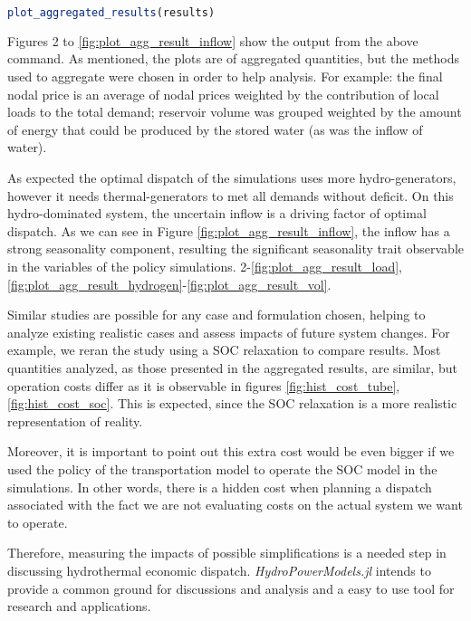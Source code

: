 \documentclass{juliacon}
\begin{document}
\begin{lstlisting}[language = Julia]
plot_aggregated_results(results)
\end{lstlisting}

Figures 2 to \ref{fig:plot_agg_result_inflow} show the output from the above command. As mentioned, the plots are of aggregated quantities, but the methods used to aggregate were chosen in order to help analysis. For example: the final nodal price is an average of nodal prices weighted by the contribution of local loads to the total demand; reservoir volume was grouped weighted by the amount of energy that could be produced by the stored water (as was the inflow of water).

As expected the optimal dispatch of the simulations uses more hydro-generators, however it needs thermal-generators to met all demands without deficit. On this hydro-dominated system, the uncertain inflow is a driving factor of optimal dispatch. As we can see in Figure \ref{fig:plot_agg_result_inflow}, the inflow has a strong seasonality component, resulting the significant seasonality trait observable in the variables of the policy simulations.
2-\ref{fig:plot_agg_result_load}, \ref{fig:plot_agg_result_hydrogen}-\ref{fig:plot_agg_result_vol}.

Similar studies are possible for any case and formulation chosen, helping to analyze existing realistic cases and assess impacts of future system changes. For example, we reran the study using a SOC relaxation to compare results. Most quantities analyzed, as those presented in the aggregated results, are similar, but operation costs differ as it is observable in figures \ref{fig:hist_cost_tube},\ref{fig:hist_cost_soc}. This is expected, since the SOC relaxation is a more realistic representation of reality.  

Moreover, it is important to point out this extra cost would be even bigger if we used the policy of the transportation model to operate the SOC model in the simulations. In other words, there is a hidden cost when planning a dispatch associated with the fact we are not evaluating costs on the actual system we want to operate. 

Therefore, measuring the impacts of possible simplifications is a needed step in discussing hydrothermal economic dispatch. \textit{HydroPowerModels.jl} intends to provide a common ground for discussions and analysis and a easy to use tool for research and applications.
\end{document}
